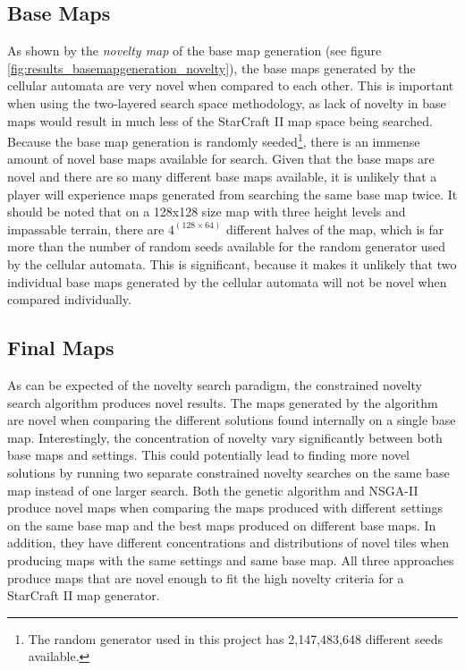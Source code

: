 \subsection{Base Maps}
\label{discussion_novelty_basemaps}
As shown by the \textit{novelty map} of the base map generation (see figure \ref{fig:results_basemapgeneration_novelty}), the base maps generated by the cellular automata are very novel when compared to each other. This is important when using the two-layered search space methodology, as lack of novelty in base maps would result in much less of the StarCraft II map space being searched. Because the base map generation is randomly seeded\footnote{The random generator used in this project has 2,147,483,648 different seeds available.}, there is an immense amount of novel base maps available for search. Given that the base maps are novel and there are so many different base maps available, it is unlikely that a player will experience maps generated from searching the same base map twice. It should be noted that on a 128x128 size map with three height levels and impassable terrain, there are $4^{(128\times 64)}$ different halves of the map, which is far more than the number of random seeds available for the random generator used by the cellular automata. This is significant, because it makes it unlikely that two individual base maps generated by the cellular automata will not be novel when compared individually.

\subsection{Final Maps}
\label{discussion_novelty_finalmaps}
As can be expected of the novelty search paradigm, the constrained novelty search algorithm produces novel results. The maps generated by the algorithm are novel when comparing the different solutions found internally on a single base map. Interestingly, the concentration of novelty vary significantly between both base maps and settings. This could potentially lead to finding more novel solutions by running two separate constrained novelty searches on the same base map instead of one larger search. Both the genetic algorithm and NSGA-II produce novel maps when comparing the maps produced with different settings on the same base map and the best maps produced on different base maps. In addition, they have different concentrations and distributions of novel tiles when producing maps with the same settings and same base map. All three approaches produce maps that are novel enough to fit the high novelty criteria for a StarCraft II map generator.

